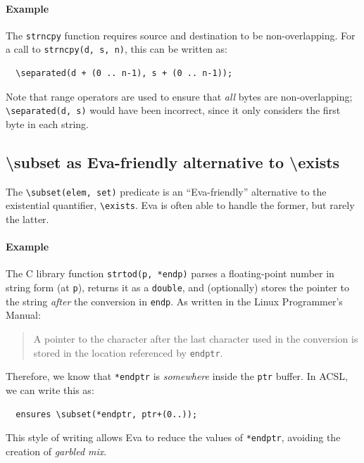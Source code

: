 \documentclass[web]{frama-c-book}
\newcommand{\Eva}{\textsf{Eva}}
\begin{document}
\paragraph{Example}

The \texttt{strncpy} function requires source and destination to be
non-overlapping. For a call to \verb+strncpy(d, s, n)+, this can be written as:

\begin{lstlisting}
  \separated(d + (0 .. n-1), s + (0 .. n-1));
\end{lstlisting}

Note that range operators are used to ensure that {\em all} bytes are
non-overlapping; \verb+\separated(d, s)+ would have been incorrect, since it
only considers the first byte in each string.

\subsection*{\textbackslash{}subset as Eva-friendly alternative to \textbackslash{}exists}

The \verb+\subset(elem, set)+ predicate is an ``\Eva{}-friendly'' alternative
to the existential quantifier, \verb+\exists+. \Eva{} is often able to handle the
former, but rarely the latter.

\paragraph{Example}
The C library function \texttt{strtod(p, *endp)} parses a floating-point number
in string form (at \texttt{p}), returns it as a \texttt{double},
and (optionally) stores the pointer to the string {\em after} the conversion in
\texttt{endp}. As written in the Linux Programmer's Manual:

\begin{quote}
  A pointer to the character after the last character used in the conversion
  is stored in the location referenced by \texttt{endptr}.
\end{quote}

Therefore, we know that \texttt{*endptr} is {\em somewhere} inside the
\texttt{ptr} buffer. In ACSL, we can write this as:

\begin{lstlisting}
  ensures \subset(*endptr, ptr+(0..));
\end{lstlisting}

This style of writing allows \Eva{} to reduce the values of \texttt{*endptr},
avoiding the creation of {\em garbled mix}.
\end{document}
